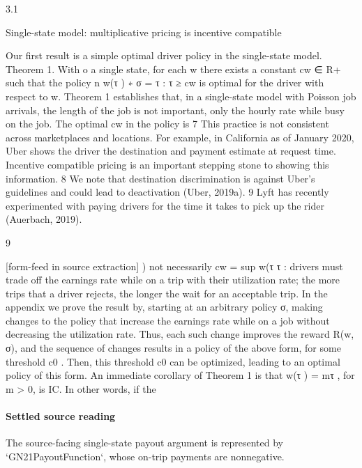 \documentclass[10pt]{article}
\begin{document}
\begin{ReviewVerbatim}
3.1

Single-state model: multiplicative pricing is incentive compatible

Our first result is a simple optimal driver policy in the single-state model.
Theorem
1. With o
a single state, for each w there exists a constant cw ∈ R+ such that the policy
n
w(τ )
∗
σ = τ : τ ≥ cw is optimal for the driver with respect to w.
Theorem 1 establishes that, in a single-state model with Poisson job arrivals, the length of the
job is not important, only the hourly rate while busy on the job. The optimal cw in the policy is
7
This practice is not consistent across marketplaces and locations. For example, in California as of January 2020,
Uber shows the driver the destination and payment estimate at request time. Incentive compatible pricing is an
important stepping stone to showing this information.
8
We note that destination discrimination is against Uber’s guidelines and could lead to deactivation (Uber, 2019a).
9
Lyft has recently experimented with paying drivers for the time it takes to pick up the rider (Auerbach, 2019).

9


[form-feed in source extraction]
)
not necessarily cw = sup w(τ
τ : drivers must trade off the earnings rate while on a trip with their
utilization rate; the more trips that a driver rejects, the longer the wait for an acceptable trip. In
the appendix we prove the result by, starting at an arbitrary policy σ, making changes to the policy
that increase the earnings rate while on a job without decreasing the utilization rate. Thus, each
such change improves the reward R(w, σ), and the sequence of changes results in a policy of the
above form, for some threshold c0 . Then, this threshold c0 can be optimized, leading to an optimal
policy of this form.
An immediate corollary of Theorem 1 is that w(τ ) = mτ , for m > 0, is IC. In other words, if the
\end{ReviewVerbatim}

\paragraph{Settled source reading}
\begin{sloppypar}
The source-\allowbreak{}facing single-\allowbreak{}state payout argument is represented by `GN21PayoutFunction`, whose on-\allowbreak{}trip payments are nonnegative.\allowbreak{}
\end{sloppypar}
\end{document}
